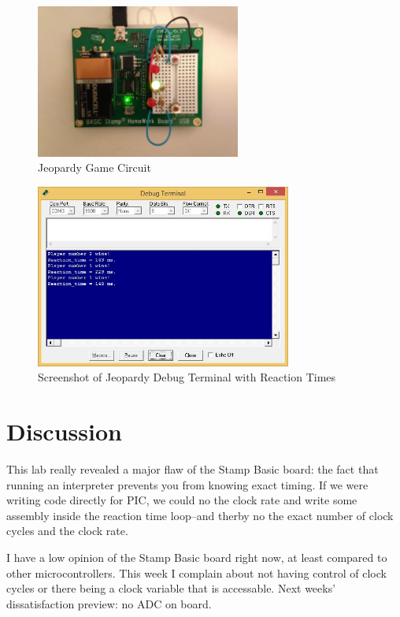 \documentclass[11pt]{article}
\begin{document}
\begin{figure}
\centering
\includegraphics[width=0.6\textwidth]{jeopardy-board.jpg}
\caption{Jeopardy Game Circuit}
\label{jeopardy-board}
\end{figure}

\begin{figure}
\centering
\includegraphics[width=0.75\textwidth]{jeopardy-screenshot.jpg}
\caption{Screenshot of Jeopardy Debug Terminal with Reaction Times}
\label{jeopardy-debug}
\end{figure}

\section{Discussion}

This lab really revealed a major flaw of the Stamp Basic board:
the fact that running an interpreter prevents you from knowing exact timing.
If we were writing code directly for PIC, we could no the clock rate and write some
assembly inside the reaction time loop--and therby no the exact number of clock cycles
and the clock rate.

I have a low opinion of the Stamp Basic board right now, at least compared to other
microcontrollers. This week I complain about not having control of clock cycles or there being
a clock variable that is accessable. Next weeks' dissatisfaction preview: no ADC on board.
\end{document}
